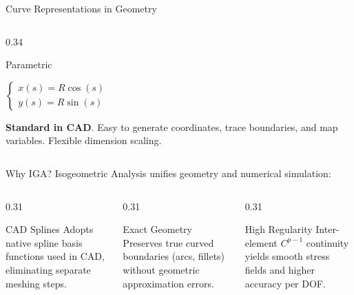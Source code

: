 \begin{frame}{Curve Representations in Geometry}
\begin{columns}[T]
\begin{column}{0.34\textwidth}
      \begin{alertblock}{Parametric}
        \centering
        \par\vspace{0.1cm}
        \centering\small \textcolor{green!60!black}{$\begin{cases} x(s) = R\cos(s) \\ y(s) = R\sin(s) \end{cases}$}
        \par\vspace{0.15cm}
        \raggedright\scriptsize
        \textbf{Standard in CAD}. Easy to generate coordinates, trace boundaries, and map variables. Flexible dimension scaling.
      \end{alertblock}
    \end{column}
  \end{columns}
\end{frame}

\begin{frame}{Why IGA?}
  \small
  Isogeometric Analysis unifies geometry and numerical simulation:

  \vspace{0.3cm}
  \begin{columns}[T]
    \begin{column}{0.31\textwidth}
      \begin{block}{CAD Splines}
        \footnotesize
        Adopts native spline basis functions used in CAD, eliminating separate meshing steps.
      \end{block}
    \end{column}

    \begin{column}{0.31\textwidth}
      \begin{block}{Exact Geometry}
        \footnotesize
        Preserves true curved boundaries (arcs, fillets) without geometric approximation errors.
      \end{block}
    \end{column}

    \begin{column}{0.31\textwidth}
      \begin{block}{High Regularity}
        \footnotesize
        Inter-element $C^{p-1}$ continuity yields smooth stress fields and higher accuracy per DOF.
      \end{block}
    \end{column}
  \end{columns}
\end{frame}

